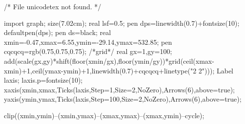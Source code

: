 /* File unicodetex not found. */

import graph; size(7.02cm); real lsf=0.5; pen dps=linewidth(0.7)+fontsize(10); defaultpen(dps); pen ds=black; real xmin=-0.47,xmax=6.55,ymin=-29.14,ymax=532.85; 
pen cqcqcq=rgb(0.75,0.75,0.75); 
/*grid*/ real gx=1,gy=100; add(scale(gx,gy)*shift(floor(xmin/gx),floor(ymin/gy))*grid(ceil(xmax-xmin)+1,ceil(ymax-ymin)+1,linewidth(0.7)+cqcqcq+linetype("2 2"))); 
Label laxis; laxis.p=fontsize(10); 
xaxis(xmin,xmax,Ticks(laxis,Step=1,Size=2,NoZero),Arrows(6),above=true); yaxis(ymin,ymax,Ticks(laxis,Step=100,Size=2,NoZero),Arrows(6),above=true); 


clip((xmin,ymin)--(xmin,ymax)--(xmax,ymax)--(xmax,ymin)--cycle); 